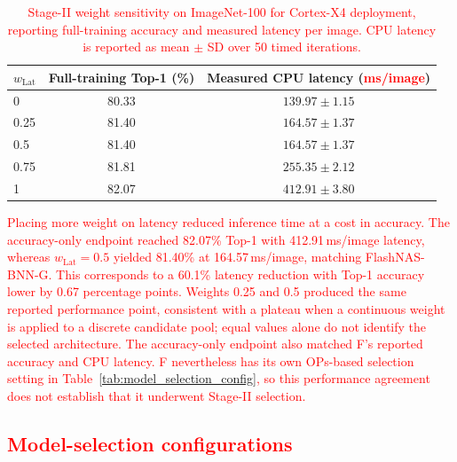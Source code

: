 \documentclass[preprint,review,12p,times]{elsarticle}
\begin{document}
\begin{table}[!htbp]
\centering
\caption{\textcolor{red}{Stage-II weight sensitivity on ImageNet-100 for Cortex-X4 deployment, reporting full-training accuracy and measured latency per image. CPU latency is reported as mean $\pm$ SD over 50 timed iterations.}}
\small
\begin{tabular}{lcc}
\toprule[1.5pt]
$w_{\mathrm{Lat}}$ & Full-training Top-1 (\%) & Measured CPU latency (\textcolor{red}{ms/image}) \\
\midrule
0 &  80.33 &  $139.97\pm1.15$  \\
0.25 & 81.40 &  $164.57\pm1.37$  \\
0.5 & 81.40 & $164.57\pm1.37$ \\
0.75 & 81.81 &  $255.35\pm2.12$  \\
1 & 82.07 & $412.91\pm3.80$ \\
\bottomrule[1.5pt]

\end{tabular}
\label{tab:8}
\end{table}

\textcolor{red}{Placing more weight on latency reduced inference time at a cost in accuracy. The accuracy-only endpoint reached 82.07\% Top-1 with 412.91\,ms/image latency, whereas $w_{\mathrm{Lat}}=0.5$ yielded 81.40\% at 164.57\,ms/image, matching FlashNAS-BNN-G. This corresponds to a 60.1\% latency reduction with Top-1 accuracy lower by 0.67 percentage points. Weights 0.25 and 0.5 produced the same reported performance point, consistent with a plateau when a continuous weight is applied to a discrete candidate pool; equal values alone do not identify the selected architecture. The accuracy-only endpoint also matched F's reported accuracy and CPU latency. F nevertheless has its own OPs-based selection setting in Table~\ref{tab:model_selection_config}, so this performance agreement does not establish that it underwent Stage-II selection.}

\FloatBarrier
\subsection{\textcolor{red}{Model-selection configurations}}
\label{sec:supp_model_selection}
\end{document}

